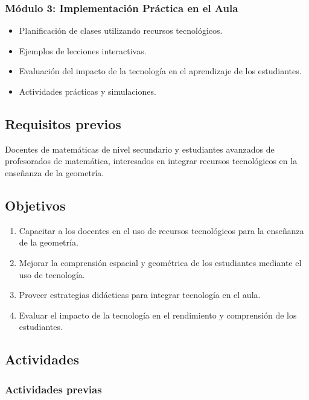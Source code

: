 \subsubsection{Módulo 3: Implementación Práctica en el Aula}

\begin{itemize}
	\item Planificación de clases utilizando recursos tecnológicos.
	\item Ejemplos de lecciones interactivas.
	\item Evaluación del impacto de la tecnología en el aprendizaje de los estudiantes. \textcite{kay1991}
	\item Actividades prácticas y simulaciones.
\end{itemize}

\subsection{Requisitos previos}

Docentes de matemáticas de nivel secundario y estudiantes avanzados de profesorados de matemática, interesados en integrar recursos tecnológicos en la enseñanza de la geometría.

\subsection{Objetivos}

\begin{enumerate}
	\item Capacitar a los docentes en el uso de recursos tecnológicos para la enseñanza de la geometría.
	\item Mejorar la comprensión espacial y geométrica de los estudiantes mediante el uso de tecnología.
	\item Proveer estrategias didácticas para integrar tecnología en el aula.
	\item Evaluar el impacto de la tecnología en el rendimiento y comprensión de los estudiantes.
\end{enumerate}

\subsection{Actividades}

\subsubsection{Actividades previas}

